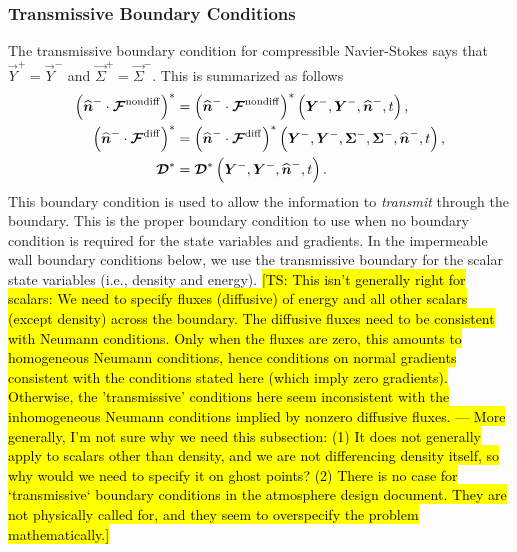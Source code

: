 \documentclass{report}
\begin{document}
\subsubsection{Transmissive Boundary Conditions}
The transmissive boundary condition for compressible Navier-Stokes says
that $\vec{Y}^{+} = \vec{Y}^{-}$ and $\vec{\Sigma}^{+} = \vec{\Sigma}^{-}$. 
This is summarized as follows
\begin{align}
  {\left( \widehat{\boldsymbol{{n}}}^{-} \cdot \boldsymbol{{\mathcal{F}}}^{\mathrm{nondiff}}\right)}^{*} &=
  {\left( \widehat{\boldsymbol{{n}}}^{-} \cdot \boldsymbol{{\mathcal{F}}}^{\mathrm{nondiff}}\right)}^{*}
  \left(\boldsymbol{{Y}}^{-}, \boldsymbol{{Y}}^{-}, \widehat{\boldsymbol{{n}}}^{-}, t\right),\\
  {\left( \widehat{\boldsymbol{{n}}}^{-} \cdot \boldsymbol{{\mathcal{F}}}^{\mathrm{diff}}\right)}^{*} &=
  {\left( \widehat{\boldsymbol{{n}}}^{-} \cdot \boldsymbol{{\mathcal{F}}}^{\mathrm{diff}}\right)}^{*}
  \left(\boldsymbol{{Y}}^{-}, \boldsymbol{{Y}}^{-}, \boldsymbol{{\Sigma}}^{-}, \boldsymbol{{\Sigma}}^{-},
  \widehat{\boldsymbol{{n}}}^{-}, t\right),\\
  \boldsymbol{{\mathcal{D}}}^{*} &=
  \boldsymbol{{\mathcal{D}}}^{*}
  \left(\boldsymbol{{Y}}^{-}, \boldsymbol{{Y}}^{-}, \widehat{\boldsymbol{{n}}}^{-}, t\right).
\end{align}
This boundary condition is used to allow the information to \emph{transmit} through the boundary.  
This is the proper boundary condition to use when no boundary condition is required for the state variables and gradients. In the impermeable wall boundary conditions below, we use the transmissive boundary for the scalar state variables (i.e., density and energy). \hl{[TS: This isn't generally right for scalars: We need to specify fluxes (diffusive) of energy and all other scalars (except density) across the boundary. The diffusive fluxes need to be consistent with Neumann conditions. Only when the fluxes are zero, this amounts to homogeneous Neumann conditions, hence conditions on normal gradients consistent with the conditions stated here (which imply zero gradients). Otherwise, the 'transmissive' conditions here seem inconsistent with the inhomogeneous  Neumann conditions implied by nonzero diffusive fluxes. --- More generally, I'm not sure why we need this subsection: (1) It does not generally apply to scalars other than density, and we are not differencing density itself, so why would we need to specify it on ghost points? (2) There is no case for `transmissive` boundary conditions in the atmosphere design document. They are not physically called for, and they seem to overspecify the problem mathematically.]}
\end{document}
